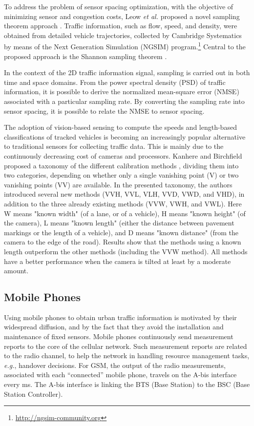 \documentclass[10pt,onecolumn]{article}
\begin{document}
To address the problem of sensor spacing optimization, with the objective of minimizing sensor and congestion costs, Leow \textit{et al.} proposed a novel sampling theorem approach \cite{Leow2008}. Traffic information, such as flow, speed, and density, were obtained from detailed vehicle trajectories, collected by Cambridge Systematics by means of the Next Generation Simulation (NGSIM) program.\footnote{\url{http://ngsim-community.org}}
Central to the proposed approach is the Shannon sampling theorem \cite{Shannon1949}. 

In the context of the 2D traffic information signal, sampling is carried out in both time and space domains. 
From the power spectral density (PSD) of traffic information, it is possible to derive the normalized mean-square error (NMSE) associated with a particular sampling rate. By converting the sampling rate into sensor spacing, it is possible to relate the NMSE to sensor spacing.

The adoption of vision-based sensing to compute the speeds and length-based classifications of tracked vehicles is becoming an increasingly popular alternative to traditional sensors for collecting traffic data.
This is mainly due to the continuously decreasing cost of cameras and processors. 
Kanhere and Birchfield proposed a taxonomy of the different calibration methods \cite{Kanhere2010}, dividing them into two categories, depending on whether only a single vanishing point (V) or two vanishing points (VV) are available. In the presented taxonomy, the authors introduced several new methods (VVH, VVL, VLH, VVD, VWD, and VHD), in addition to the three already existing methods (VVW, VWH, and VWL). 
Here W means "known width" (of a lane, or of a vehicle), H means "known height" (of the camera), L means "known length" (either the distance between pavement markings or the length of a vehicle), and D means "known distance" (from the camera to the edge of the road). 
Results show that the methods using a known length outperform the other methods (including the VVW method).
All methods have a better performance when the camera is tilted at least by a moderate amount.


\subsection{Mobile Phones}

Using mobile phones to obtain urban traffic information is motivated by their widespread diffusion, and by the fact that they avoid the installation and maintenance of fixed sensors.
Mobile phones continuously send measurement reports to the core of the cellular network. Such measurement reports are related to the radio channel, to help the network in handling resource management tasks, \textit{e.g.}, handover decisions. 
For GSM, the output of the radio measurements, associated with each ``connected'' mobile phone, travels on the A-bis interface every  ms. The A-bis interface is linking the BTS (Base Station) to the BSC (Base Station Controller).
\end{document}
